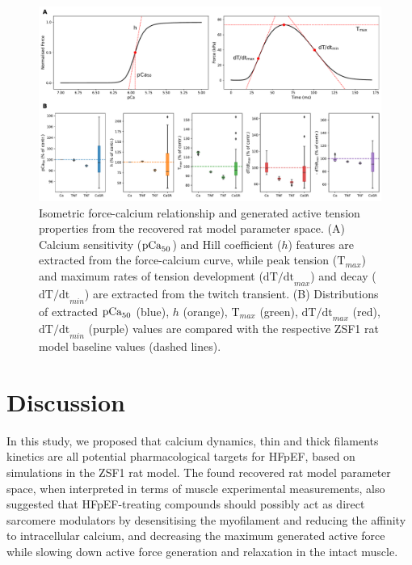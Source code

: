 \begin{figure}[!ht]
    \myfloatalign
    \includegraphics[width=\textwidth]{figures/chapter07/FpCa_T_trends_explained.pdf}
    \caption{Isometric force-calcium relationship and generated active tension properties from the recovered rat model parameter space. (A) Calcium sensitivity ($\textrm{pCa}_{50}$) and Hill coefficient ($h$) features are extracted from the force-calcium curve, while peak tension ($\textrm{T}_{max}$) and maximum rates of tension development ($\textrm{dT/dt}_{max}$) and decay ($\textrm{dT/dt}_{min}$) are extracted from the twitch transient. (B) Distributions of extracted $\textrm{pCa}_{50}$ (blue), $h$ (orange), $\textrm{T}_{max}$ (green), $\textrm{dT/dt}_{max}$ (red), $\textrm{dT/dt}_{min}$ (purple) values are compared with the respective ZSF1 rat model baseline values (dashed lines).}
    \label{fig:fpcatension}
\end{figure}


%
%
%
\section{Discussion}\label{sec:ch7discussion}

\noindent
In this study, we proposed that calcium dynamics, thin and thick filaments kinetics are all potential pharmacological targets for HFpEF, based on simulations in the ZSF1 rat model. The found recovered rat model parameter space, when interpreted in terms of muscle experimental measurements, also suggested that HFpEF-treating compounds should possibly act as direct sarcomere modulators by desensitising the myofilament and reducing the affinity to intracellular calcium, and decreasing the maximum generated active force while slowing down active force generation and relaxation in the intact muscle.

